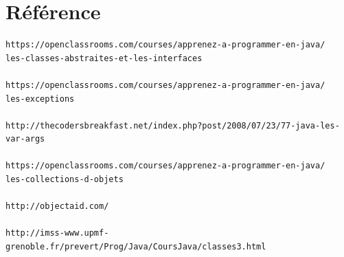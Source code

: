 \documentclass[12pt]{report}
\begin{document}
\section{Référence}
\begin{verbatim}
https://openclassrooms.com/courses/apprenez-a-programmer-en-java/
les-classes-abstraites-et-les-interfaces

https://openclassrooms.com/courses/apprenez-a-programmer-en-java/
les-exceptions

http://thecodersbreakfast.net/index.php?post/2008/07/23/77-java-les-var-args

https://openclassrooms.com/courses/apprenez-a-programmer-en-java/
les-collections-d-objets

http://objectaid.com/

http://imss-www.upmf-grenoble.fr/prevert/Prog/Java/CoursJava/classes3.html
\end{verbatim}
\end{document}
